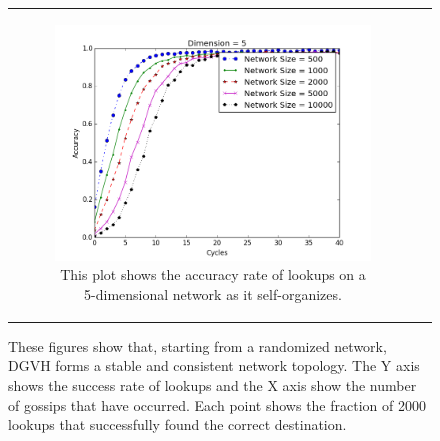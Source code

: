 \documentclass[11pt, conference, letterpaper]{IEEEtran}
\begin{document}
\begin{figure}
\begin{tabular}{cc}
		
		\begin{subfigure}{\columnwidth}
			\includegraphics[width=\linewidth]{conv_d5}
			\caption{This plot shows the accuracy rate of lookups on a 5-dimensional network as it self-organizes.}
			\label{conv5}
		\end{subfigure}
		
	\end{tabular}
	
	\caption{These figures show that, starting from a randomized network, DGVH forms a stable and consistent network topology.
		The Y axis shows the success rate of lookups and the X axis show the number of gossips that have occurred.
		Each point shows the fraction of 2000 lookups that successfully found the correct destination.}
	
\end{figure}
\end{document}
